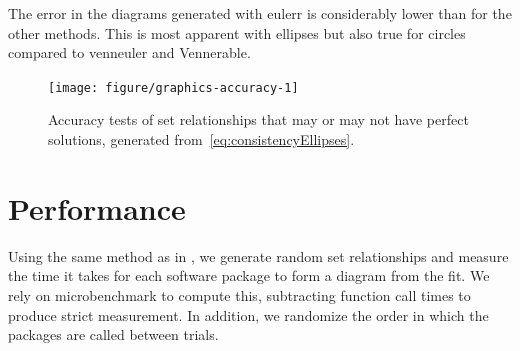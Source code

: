\documentclass[
  oneside,
  openany,
  numbers=noendperiod,
  parskip=half,
  bibliography=totoc
]{scrbook}\usepackage[]{graphicx}\usepackage{xcolor}
\newenvironment{knitrout}{}{} %
\newcommand{\pkg}[1]{{\fontseries{b}\selectfont #1}}
\begin{document}
\begin{alg}
\DontPrintSemicolon
{}
\end{alg}

The error in the diagrams generated with \pkg{eulerr} is considerably lower
than for the other methods. This is most apparent with ellipses but also true
for circles compared to \pkg{venneuler} and \pkg{Vennerable}.

\begin{figure}[hbtp]
\begin{knitrout}\small
{}\color{fgcolor}

{\centering \texttt{[image: figure/graphics-accuracy-1]} 

}



\end{knitrout}
\caption{Accuracy tests of set relationships that may or may not have perfect
solutions, generated from~\eqref{eq:consistencyEllipses}.}
\label{fig:accuracy}
\end{figure}

\section{Performance}
\label{sec:performance}

Using the same method as in , we generate random set
relationships and measure the time it takes for each software package to form a
diagram from the fit. We rely on \pkg{microbenchmark} to compute this,
subtracting function call times to produce strict measurement. In addition, we
randomize the order in which the packages are called between trials.
\end{document}
